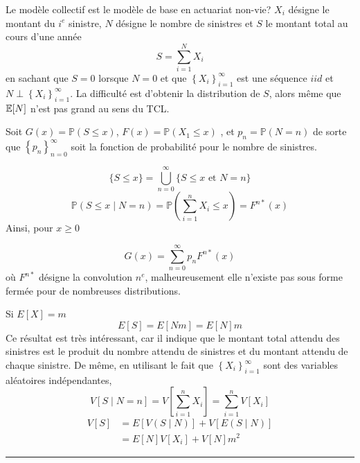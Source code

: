 \begin{f}
Le modèle collectif est le modèle de base en actuariat non-vie?
	 $X_{i}$ désigne le montant du $i^e$ sinistre, $N$ désigne le nombre de sinistres et $S$ le montant total au cours d'une année
	$$
	S=\sum_{i=1}^{N} X_{i}
	$$
	en sachant que $S=0$ lorsque $N=0 $ et que $\left\{X_{i}\right\}_{i=1}^{\infty}$ est une séquence $iid$ et  $N \perp \left\{X_{i}\right\}_{i=1}^{\infty}$. 
La difficulté est d'obtenir la distribution de $S$, alors même que $\mathbb{E} [N]$ n'est pas grand au sens du TCL.
\end{f}


\begin{f}[La distribution de $S$]
	
Soit $G(x)=\mathbb{P}(S \leq x)$, $F(x)=\mathbb{P}\left(X_{1} \leq x\right)$ , et $p_{n}=\mathbb{P}(N=n)$ de sorte que $\left\{p_{n}\right\}_{n=0}^{\infty}$ soit la fonction de probabilité pour le nombre de sinistres.
	
	$$
	\{S \leq x\}=\bigcup_{n=0}^{\infty}\{S \leq x \text { et } N=n\}
	$$
	$$
	\mathbb{P}(S \leq x \mid N=n)=\mathbb{P}\left(\sum_{i=1}^{n} X_{i} \leq x\right)=F^{n *}(x)
	$$
	Ainsi, pour $x \geq 0$
	
	\begin{equation*}\label{GxCollectif}
		G(x)=\sum_{n=0}^{\infty} p_{n} F^{n *}(x)
	\end{equation*}
	où $F^{n *}$ désigne la convolution $n^e$, malheureusement elle n'existe pas sous forme fermée pour de nombreuses distributions.	
	
Si $E[X]=m$
	$$
	E[S]=E\left[N m\right]=E[N] m
	$$
	Ce résultat est très intéressant, car il indique que le montant total attendu des sinistres est le produit du nombre attendu de sinistres et du montant attendu de chaque sinistre. De même, en utilisant le fait que $\left\{X_{i}\right\}_{i=1}^{\infty}$ sont des variables aléatoires indépendantes,
	$$
	V[S \mid N=n]=V\left[\sum_{i=1}^{n} X_{i}\right]=\sum_{i=1}^{n} V\left[X_{i}\right]
	$$
	$$
	\begin{aligned}
		V[S] &=E[V(S \mid N)]+V[E(S \mid N)] \\
		&=E[N] V\left[X_{i}\right]+V[N] m^{2}
	\end{aligned}
	$$    
\end{f}

\hrule


